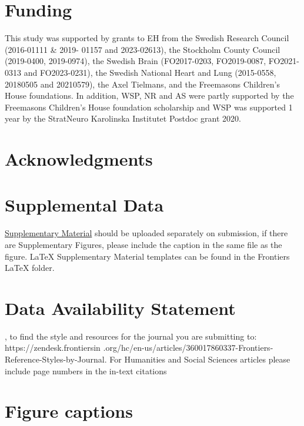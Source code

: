\documentclass[utf8]{FrontiersinHarvard}
\begin{document}
    \section*{Funding}
    This study was supported by grants to EH from the Swedish Research Council (2016-01111 \& 2019-
    01157 and 2023-02613), the Stockholm County Council (2019-0400, 2019-0974), the Swedish Brain
    (FO2017-0203, FO2019-0087, FO2021-0313 and FO2023-0231), the Swedish National Heart and Lung (2015-0558, 20180505
    and 20210579), the Axel Tielmans, and the Freemasons Children’s House foundations.
    In addition, WSP, NR and AS were partly supported by the Freemasons Children’s House foundation scholarship and
    WSP was supported 1 year by the StratNeuro Karolinska Institutet Postdoc grant 2020.

    \section*{Acknowledgments}

    \section*{Supplemental Data}
    \href{http://home.frontiersin.org/about/author-guidelines#SupplementaryMaterial}{Supplementary Material} should
    be uploaded separately on submission, if there are Supplementary Figures, please include the caption in the same
    file as the figure. LaTeX Supplementary Material templates can be found in the Frontiers LaTeX folder.

    \section*{Data Availability Statement}

    , to find the style and resources for the journal you are submitting to: https://zendesk.frontiersin
    .org/hc/en-us/articles/360017860337-Frontiers-Reference-Styles-by-Journal. For Humanities and Social Sciences
    articles please include page numbers in the in-text citations
    

    \section*{Figure captions}
    

\end{document}
